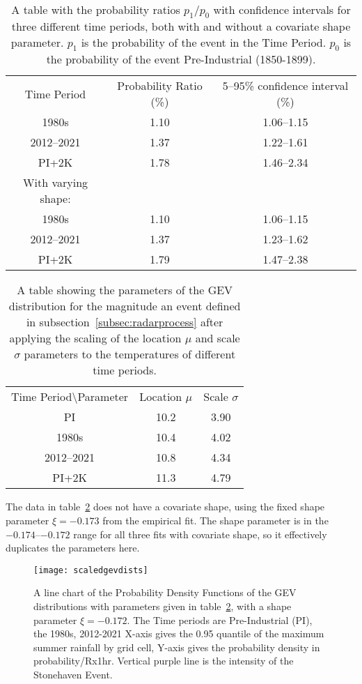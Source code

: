 \begin{table}[H]
   \centering
    \begin{tabular}{c c c}
        Time Period & Probability Ratio (\%) & 5--95\% confidence interval (\%) \\
        1980s & 1.10 & 1.06--1.15 \\
        2012--2021 & 1.37 & 1.22--1.61 \\
        PI+2K & 1.78 & 1.46--2.34 \\
        With varying shape: && \\
        1980s & 1.10 & 1.06--1.15 \\
        2012--2021 & 1.37 & 1.23--1.62 \\
        PI+2K & 1.79 & 1.47--2.38 \\
    \end{tabular}
    \caption{A table with the probability ratios $p_1/p_0$ with confidence intervals for three different time periods,
        both with and without a covariate shape parameter.
    $p_1$ is the probability of the event in the Time Period.
    $p_0$ is the probability of the event Pre-Industrial (1850-1899).}
    \label{tab:prtable}
\end{table}

\begin{table}[H]
    \centering
    \begin{tabular}{c c c}
        Time Period\textbackslash Parameter & Location $\mu$ & Scale $\sigma$ \\
        PI & 10.2 & 3.90 \\
        1980s & 10.4 & 4.02 \\
        2012--2021 & 10.8 & 4.34 \\
        PI+2K & 11.3 & 4.79
    \end{tabular}
    \caption{A table showing the parameters of the GEV distribution for the magnitude an event defined in subsection~\ref{subsec:radarprocess} after
        applying the scaling of the location $\mu$ and scale $\sigma$ parameters to the temperatures of different time periods.}
    \label{tab:0.95params}
\end{table}

The data in table~\ref{tab:0.95params} does not have a covariate shape,
    using the fixed shape parameter $\xi = -0.173$ from the empirical fit.
The shape parameter is in the $-0.174$--$-0.172$ range for all three fits with covariate shape,
    so it effectively duplicates the parameters here.

\begin{figure}[H]
    \centering
    \texttt{[image: scaledgevdists]}
    \caption{A line chart of the Probability Density Functions of the GEV distributions with parameters given in table~\ref{tab:0.95params},
        with a shape parameter $\xi = -0.172$.
    The Time periods are Pre-Industrial (PI), the 1980s, 2012-2021
    X-axis gives the 0.95 quantile of the maximum summer rainfall by grid cell,
        Y-axis gives the probability density in probability/Rx1hr.
    Vertical purple line is the intensity of the Stonehaven Event.}
    \label{fig:scaledgevdists}
\end{figure}

